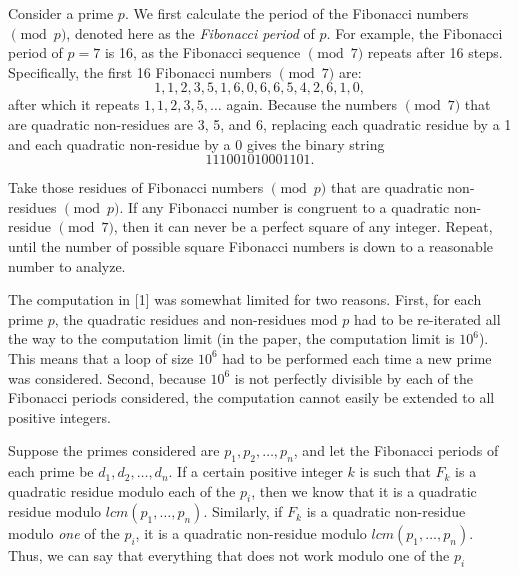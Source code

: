 \documentclass[11pt]{article}
\begin{document}
Consider a prime $p$. We first calculate the period of the Fibonacci numbers $\pmod p$, denoted here as the \textit{Fibonacci period} of $p$. For example, the Fibonacci period of $p = 7$ is 16, as the Fibonacci sequence $\pmod 7$ repeats after 16 steps. Specifically, the first 16 Fibonacci numbers $\pmod{7}$ are: \[ 1, 1, 2, 3, 5, 1, 6, 0, 6, 6, 5, 4, 2, 6, 1, 0, \] after which it repeats $1, 1, 2, 3, 5, \dots$ again. Because the numbers $\pmod{7}$ that are quadratic non-residues are 3, 5, and 6, replacing each quadratic residue by a 1 and each quadratic non-residue by a 0 gives the binary string \[111001010001101.\]

Take those residues of Fibonacci numbers $\pmod{p}$ that are quadratic non-residues $\pmod{p}$. If any Fibonacci number is congruent to a quadratic non-residue $\pmod{7}$, then it can never be a perfect square of any integer. Repeat, until the number of possible square Fibonacci numbers is down to a reasonable number to analyze.

The computation in [1] was somewhat limited for two reasons. First, for each prime $p$, the quadratic residues and non-residues mod $p$ had to be re-iterated all the way to the computation limit (in the paper, the computation limit is $10^6$). This means that a loop of size $10^6$ had to be performed each time a new prime was considered. Second, because $10^6$ is not perfectly divisible by each of the Fibonacci periods considered, the computation cannot easily be extended to all positive integers.

Suppose the primes considered are $p_1, p_2, \dots , p_n$, and let the Fibonacci periods of each prime be $d_1, d_2, \dots , d_n$. If a certain positive integer $k$ is such that $F_k$ is a quadratic residue modulo each of the $p_i$, then we know that it is a quadratic residue modulo $lcm(p_1, \dots , p_n)$. Similarly, if $F_k$ is a quadratic non-residue modulo \textit{one} of the $p_i$, it is a quadratic non-residue modulo $lcm(p_1, \dots , p_n)$. Thus, we can say that everything that does not work modulo one of the $p_i$ 
\end{document}
